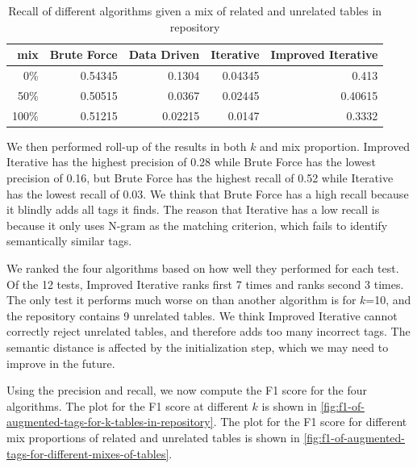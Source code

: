 \begin{table}[ht!]
    \centering
    \scriptsize
    \begin{center}
      \caption{Recall of different algorithms given a mix of related and unrelated tables in repository}
      \label{tab:Recall-of-different-algorithms-given-a-mix-of-related-and-unrelated-tables-in-repository}
      \begin{tabular}{|r|r|r|r|r|}
        \hline
        \textbf{mix} & \textbf{Brute Force} & \textbf{Data Driven} & \textbf{Iterative} & \textbf{Improved Iterative} \\
        \hline
        0\% & 0.54345 & 0.1304 & 0.04345 & 0.413 \\
        \hline
        50\% & 0.50515 & 0.0367 & 0.02445 & 0.40615 \\
        \hline
        100\% & 0.51215 & 0.02215 & 0.0147 & 0.3332 \\
        \hline        
      \end{tabular}
    \end{center}
\end{table}

We then performed roll-up of the results in both $k$ and mix proportion. Improved Iterative has the highest precision of 0.28 while Brute Force has the lowest precision of 0.16, but Brute Force has the highest recall of 0.52 while Iterative has the lowest recall of 0.03. We think that Brute Force has a high recall because it blindly adds all tags it finds. The reason that Iterative has a low recall is because it only uses N-gram as the matching criterion, which fails to identify semantically similar tags.

We ranked the four algorithms based on how well they performed for each test. Of the 12 tests, Improved Iterative ranks first 7 times and ranks second 3 times. The only test it performs much worse on than another algorithm is for $k$=10, and the repository contains 9 unrelated tables. We think Improved Iterative cannot correctly reject unrelated tables, and therefore adds too many incorrect tags. The semantic distance is affected by the initialization step, which we may need to improve in the future.

Using the precision and recall, we now compute the F1 score for the four algorithms. The plot for the F1 score at different $k$ is shown in \autoref{fig:f1-of-augmented-tags-for-k-tables-in-repository}. The plot for the F1 score for different mix proportions of related and unrelated tables is shown in \autoref{fig:f1-of-augmented-tags-for-different-mixes-of-tables}.

